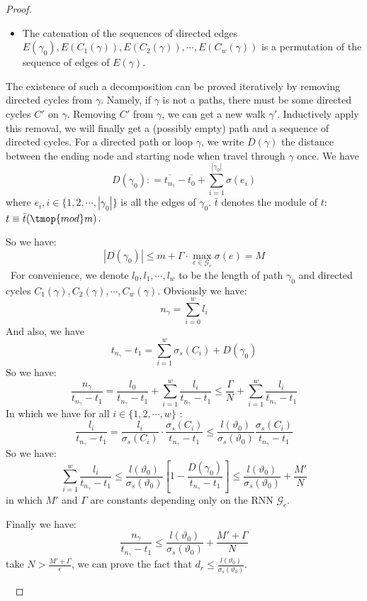 \begin{proof}
\begin{itemize}
    \item The catenation of the sequences of directed edges $E (\gamma_0), E
    (C_1 (\gamma)), E (C_2 (\gamma)), \cdots, E (C_w (\gamma))$ is a
    permutation of the sequence of edges of $E (\gamma)$.
  \end{itemize}
  The existence of such a decomposition can be proved iteratively by removing
  directed cycles from $\gamma$. Namely, if $\gamma$ is not a paths, there
  must be some directed cycles $C'_{}$ on $\gamma$. Removing $C'$ from
  $\gamma$, we can get a new walk $\gamma'$. Inductively apply this removal,
  we will finally get a (possibly empty) path and a sequence of directed
  cycles. For a directed path or loop $\gamma$, we write $D (\gamma)$ the
  distance between the ending node and starting node when travel through
  $\gamma$ once. We have
  \[ D (\gamma_0) : = \overline{t_{n_{\gamma}}} - \overline{t_0} + \sum_{i =
     1}^{| \gamma_0 |} \sigma (e_i) \]
  where $e_i, i \in \{ 1, 2, \cdots, | \gamma_0 | \}$ is all the edges of
  $\gamma_0$. $\bar{t}$ denotes the module of $t$: $t \equiv \bar{t}
  (\tmop{mod} m)$.
  
  So we have:
  \[ | D (\gamma_0) | \leq m + \Gamma \cdot \max_{e \in \mathcal{G}_c} \sigma
     (e) = M \]
  \ For convenience, we denote $l_0, l_1, \cdots, l_w$ to be the length of
  path $\gamma_0$ and directed cycles $C_1 (\gamma), C_2 (\gamma), \cdots, C_w
  (\gamma)$. Obviously we have:
  \[ n_{\gamma} = \sum_{i = 0}^w l_i \]
  And also, we have
  \[ t_{n_\gamma} - t_1 = \sum_{i = 1}^w \sigma_s (C_i) + D (\gamma_0) \]
  So we have:
  \[ \frac{n_{\gamma}}{t_{n_\gamma} - t_1} = \frac{l_0}{t_{n_\gamma} - t_1} + \sum_{i = 1}^w
     \frac{l_i}{t_{n_\gamma} - t_1} \leq \frac{\Gamma}{N} + \sum_{i = 1}^w
     \frac{l_i}{t_{n_\gamma} - t_1} \]
  In which we have for all $i \in \{ 1, 2, \cdots, w \}$ :
  \[ \frac{l_i}{t_{n_\gamma} - t_1} = \frac{l_i}{\sigma_s (C_i)} \cdot \frac{\sigma_s
     (C_i)}{t_{n_\gamma} - t_1} \leq \frac{l (\vartheta_0)}{\sigma_s (\vartheta_0)}
     \frac{\sigma_s (C_i)}{t_{n_\gamma} - t_1} \]
  So we have:
  \[ \sum_{i = 1}^w \frac{l_i}{t_{n_\gamma} - t_1} \leq \frac{l
     (\vartheta_0)}{\sigma_s (\vartheta_0)} \left[ 1 - \frac{D (\gamma_0)}{t_{n_\gamma}
     - t_1} \right] \leq \frac{l (\vartheta_0)}{\sigma_s (\vartheta_0)} +
     \frac{M'}{N} \]
  in which $M'$ and $\Gamma$ are constants depending only on the RNN
  $\mathcal{G}_c$.
  
  Finally we have:
  \[ \frac{n_{\gamma}}{t_{n_\gamma} - t_1} \leq \frac{l (\vartheta_0)}{\sigma_s
     (\vartheta_0)} + \frac{M' + \Gamma}{N} \]
  take $N > \frac{M' + \Gamma}{\epsilon}$, we can prove the fact that $d_r
  \leq \frac{l (\vartheta_0)}{\sigma_s (\vartheta_0)}$.
  
  \ 
\end{proof}

